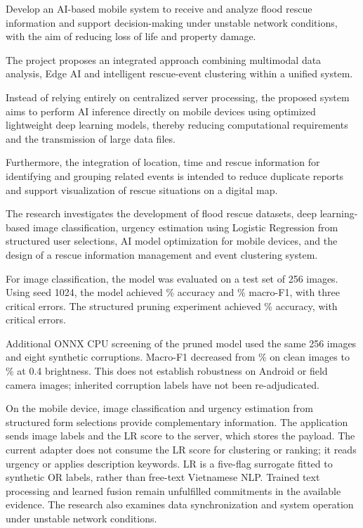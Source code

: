 
Develop an AI-based mobile system to receive and analyze flood rescue information and support decision-making under unstable network conditions, with the aim of reducing loss of life and property damage.

The project proposes an integrated approach combining multimodal data analysis, Edge AI and intelligent rescue-event clustering within a unified system.

Instead of relying entirely on centralized server processing, the proposed system aims to perform AI inference directly on mobile devices using optimized lightweight deep learning models, thereby reducing computational requirements and the transmission of large data files.

Furthermore, the integration of location, time and rescue information for identifying and grouping related events is intended to reduce duplicate reports and support visualization of rescue situations on a digital map.

The research investigates the development of flood rescue datasets, deep learning-based image classification, urgency estimation using Logistic Regression from structured user selections, AI model optimization for mobile devices, and the design of a rescue information management and event clustering system.

For image classification, the model was evaluated on a test set of 256 images. Using seed 1024, the model achieved \NewImageAccuracy\% accuracy and \NewImageMacroFOne\% macro-F1, with three critical errors. The structured pruning experiment achieved \PruningAccuracy\% accuracy, with \PruningCriticalCount{} critical errors.

Additional ONNX CPU screening of the pruned model used the same 256 images and eight synthetic corruptions. Macro-F1 decreased from \QualityCleanMacroFOne\% on clean images to \QualityDarkMacroFOne\% at 0.4 brightness. This does not establish robustness on Android or field camera images; inherited corruption labels have not been re-adjudicated.

On the mobile device, image classification and urgency estimation from structured form selections provide complementary information. The application sends image labels and the LR score to the server, which stores the payload. The current adapter does not consume the LR score for clustering or ranking; it reads urgency or applies description keywords. LR is a five-flag surrogate fitted to synthetic OR labels, rather than free-text Vietnamese NLP. Trained text processing and learned fusion remain unfulfilled commitments in the available evidence. The research also examines data synchronization and system operation under unstable network conditions.

